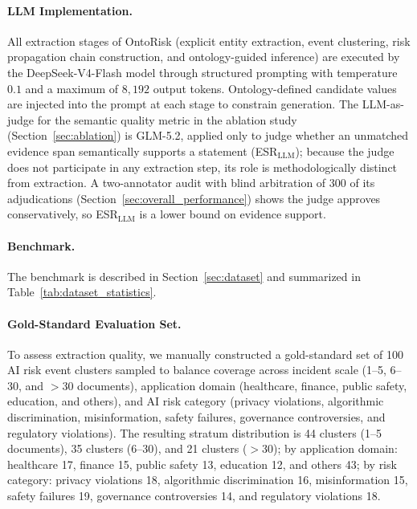 \documentclass[a4paper,fleqn]{cas-dc}
\begin{document}
\paragraph{LLM Implementation.}
All extraction stages of OntoRisk (explicit entity extraction, event
clustering, risk propagation chain construction, and ontology-guided
inference) are executed by the DeepSeek-V4-Flash model through
structured prompting with temperature $0.1$ and a maximum of $8{,}192$
output tokens.
Ontology-defined candidate values are injected into the prompt at each
stage to constrain generation.
The LLM-as-judge for the semantic quality metric in the ablation
study (Section~\ref{sec:ablation}) is GLM-5.2, applied only to judge
whether an unmatched evidence span semantically supports a statement
(ESR$_{\text{LLM}}$); because the judge does not participate
in any extraction step, its role is methodologically distinct from
extraction.
A two-annotator audit with blind arbitration of 300 of its
adjudications (Section~\ref{sec:overall_performance}) shows the judge
approves conservatively, so ESR$_{\text{LLM}}$ is a lower bound on
evidence support.

\paragraph{Benchmark.}
The benchmark is described in Section~\ref{sec:dataset} and summarized
in Table~\ref{tab:dataset_statistics}.

\paragraph{Gold-Standard Evaluation Set.}
To assess extraction quality, we manually constructed a gold-standard
set of 100 AI risk event clusters sampled to balance coverage across
incident scale (1--5, 6--30, and $>$30 documents), application domain
(healthcare, finance, public safety, education, and others), and AI
risk category (privacy violations, algorithmic discrimination,
misinformation, safety failures, governance controversies, and
regulatory violations).
The resulting stratum distribution is 44 clusters (1--5 documents),
35 clusters (6--30), and 21 clusters ($>$30); by application domain:
healthcare 17, finance 15, public safety 13, education 12, and
others 43; by risk category: privacy violations 18, algorithmic
discrimination 16, misinformation 15, safety failures 19,
governance controversies 14, and regulatory violations 18.
\end{document}
